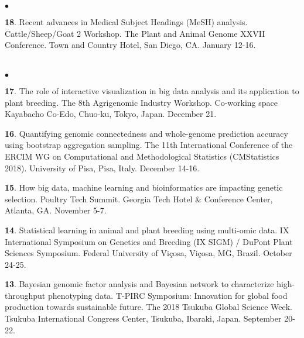 \documentclass[margin,line,10pt]{res}
\newenvironment{list2}{
  \begin{list}{$\bullet$}{%
      \setlength{\itemsep}{0in}
      \setlength{\parsep}{0in} \setlength{\parskip}{0in}
      \setlength{\topsep}{0in} \setlength{\partopsep}{0in} 
      \setlength{\leftmargin}{0.2in}}}{\end{list}}
\begin{document}
\begin{resume}
\begin{list2}
  \vspace{0.5cm}

 \item [{\bf 18}.] Recent advances in Medical Subject Headings (MeSH) analysis. Cattle/Sheep/Goat 2 Workshop. The Plant and Animal Genome XXVII Conference. Town and Country Hotel, San Diego, CA. January 12-16.

\end{list2}

  
  
\section{}
\begin{list2}

  \item [{\bf 17}.] The role of interactive visualization in big data analysis and its application to plant breeding. The 8th Agrigenomic Industry Workshop. Co-working space Kayabacho Co-Edo, Chuo-ku, Tokyo, Japan. December 21.

    \vspace{0.5cm}
    
   \item [{\bf 16}.] Quantifying genomic connectedness and whole-genome prediction accuracy using bootstrap aggregation sampling. The 11th International Conference of the ERCIM WG on Computational and Methodological Statistics (CMStatistics 2018). University of Pisa, Pisa, Italy. December 14-16.

     \vspace{0.5cm}
     
    \item [{\bf 15}.] How big data, machine learning and bioinformatics are impacting genetic selection. Poultry Tech Summit. Georgia Tech Hotel \& Conference Center, Atlanta, GA. November 5-7.

      \vspace{0.5cm}
      
  \item [{\bf 14}.] Statistical learning in animal and plant breeding using multi-omic data. IX International Symposium on Genetics and Breeding (IX SIGM) / DuPont Plant Sciences Symposium.  Federal University of Vi\c cosa, Vi\c cosa, MG, Brazil. October 24-25.
  
  
  \vspace{0.5cm}
  
\item [{\bf 13}.] Bayesian genomic factor analysis and Bayesian network to characterize high-throughput phenotyping data. T-PIRC Symposium: Innovation for global food production towards sustainable future. The 2018 Tsukuba Global Science Week. Tsukuba International Congress Center, Tsukuba, Ibaraki, Japan. September 20-22.
  


\end{list2}
\end{resume}
\end{document}
